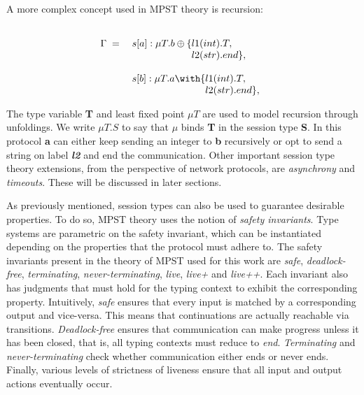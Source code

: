 A more complex concept used in MPST theory is recursion:

\begin{equation}
    \label{eqn:mpst_example_rec}
    \begin{array}{rl}
        \textbf{\ensuremath{\Gamma}} \; = \;  & s[a]:\mu T.b\ensuremath{\oplus\{}\begin{array}{@{}l}\\\ensuremath{l1(int).T,} \\ \ensuremath{l2(str).end \},}\end{array} \cr
        & s[b]:\mu T.a\ensuremath{\with\{}\begin{array}{@{}l}\\\ensuremath{l1(int).T,} \\ \ensuremath{l2(str).end \},}\end{array}
    \end{array}
\end{equation}

The type variable \textbf{T} and least fixed point \textbf{\ensuremath{\mu T}} are used to model recursion through unfoldings.
We write \textbf{\ensuremath{\mu T.S}} to say that \textbf{\ensuremath{\mu}} binds \textbf{T} in the session type \textbf{S}.
In this protocol \textbf{a} can either keep sending an integer to \textbf{b} recursively or opt to send a string on label \textbf{\textit{l2}} and end the communication.
Other important session type theory extensions, from the perspective of network protocols, are \textit{asynchrony} and \textit{timeouts}.
These will be discussed in later sections.

As previously mentioned, session types can also be used to guarantee desirable properties.
To do so, MPST theory uses the notion of \textit{safety invariants}.
Type systems are parametric on the safety invariant, which can be instantiated depending on the properties that the protocol must adhere to.
The safety invariants present in the theory of MPST used for this work are \textit{safe}, \textit{deadlock-free}, \textit{terminating}, \textit{never-terminating}, \textit{live}, \textit{live+} and \textit{live++}.
Each invariant also has judgments that must hold for the typing context to exhibit the corresponding property.
Intuitively, \textit{safe} ensures that every input is matched by a corresponding output and vice-versa.
This means that continuations are actually reachable via transitions.
\textit{Deadlock-free} ensures that communication can make progress unless it has been closed, that is, all typing contexts must reduce to \textit{end}.
\textit{Terminating} and \textit{never-terminating} check whether communication either ends or never ends.
Finally, various levels of strictness of liveness ensure that all input and output actions eventually occur.

